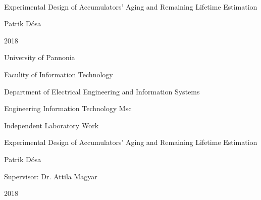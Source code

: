 \begin{titlepage}
	\setlength{\hoffset}{0mm}
	\pagestyle{empty}
	\begin{center} 
		~\\
		\vspace{125pt}	
		\Large 
		Experimental Design of Accumulators' Aging and Remaining Lifetime Estimation
		\vspace{200pt}
		
		\Large Patrik Dósa
		\vspace{60pt}
		
		\Large 
		2018
	\end{center}
	
	\newpage
	
	\pagestyle{empty}
	
	\newpage
	\pagestyle{empty}
	\begin{center}
		\Large
		University of Pannonia
		
		\vspace{10mm}
		Faculity of Information Technology
		
		\vspace{10mm}
		Department of Electrical Engineering and Information Systems
		
		\vspace{10mm}
		Engineering Information Technology Msc
		
		\vspace{40mm}
		\huge
		Independent Laboratory Work
		
		\vspace{10mm}
		\LARGE
		Experimental Design of Accumulators' Aging and Remaining Lifetime Estimation
		
		\vspace{10mm}
		\Large
		Patrik Dósa
		
		\vspace{15mm}
		Supervisor: Dr. Attila Magyar
		
		\vspace{20mm}
		2018
		\normalsize
	\end{center}
\end{titlepage}

\setlength{\hoffset}{4mm}
\newpage